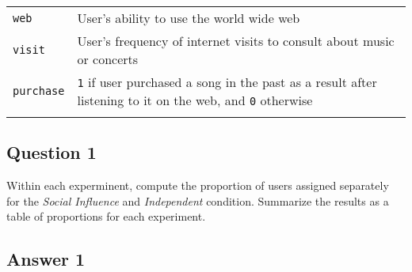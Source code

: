 \documentclass[]{article}
\begin{document}
\begin{longtable}[c]{@{}ll@{}}
\begin{minipage}[t]{0.18\columnwidth}
\texttt{web}
\end{minipage} & \begin{minipage}[t]{0.76\columnwidth}\raggedright
User's ability to use the world wide web
\end{minipage}
\\\addlinespace
\begin{minipage}[t]{0.18\columnwidth}\raggedright
\texttt{visit}
\end{minipage} & \begin{minipage}[t]{0.76\columnwidth}\raggedright
User's frequency of internet visits to consult about music or concerts
\end{minipage}
\\\addlinespace
\begin{minipage}[t]{0.18\columnwidth}\raggedright
\texttt{purchase}
\end{minipage} & \begin{minipage}[t]{0.76\columnwidth}\raggedright
\texttt{1} if user purchased a song in the past as a result after
listening to it on the web, and \texttt{0} otherwise
\end{minipage}
\\\addlinespace
\bottomrule
\end{longtable}

\subsection{Question 1}\label{question-1}

Within each experminent, compute the proportion of users assigned
separately for the \emph{Social Influence} and \emph{Independent}
condition. Summarize the results as a table of proportions for each
experiment.

\subsection{Answer 1}\label{answer-1}
\end{document}
